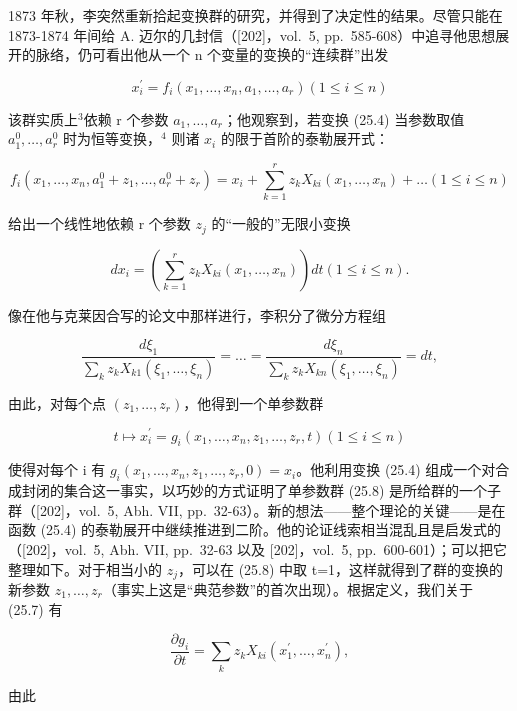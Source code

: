 1873 年秋，李突然重新拾起变换群的研究，并得到了决定性的结果。尽管只能在 1873-1874 年间给 A. 迈尔的几封信（{[}202{]}，vol.~5, pp.~585-608）中追寻他思想展开的脉络，仍可看出他从一个 n 个变量的变换的“连续群”出发

\[
x _ {i} ^ {\prime} = f _ {i} (x _ {1}, \dots , x _ {n}, a _ {1}, \dots , a _ {r}) (1 \leq i \leq n)\tag{25.4}
\]

该群实质上\(^{3}\)依赖 r 个参数 \(a_{1},\ldots,a_{r}\)；他观察到，若变换 (25.4) 当参数取值 \(a_{1}^{0},\ldots,a_{r}^{0}\) 时为恒等变换，\(^{4}\) 则诸 \(x_{i}\) 的限于首阶的泰勒展开式：

\[
f _ {i} \left(x _ {1}, \dots , x _ {n}, a _ {1} ^ {0} + z _ {1}, \dots , a _ {r} ^ {0} + z _ {r}\right) = x _ {i} + \sum_ {k = 1} ^ {r} z _ {k} X _ {k i} \left(x _ {1}, \dots , x _ {n}\right) + \dots (1 \leq i \leq n)\tag{25.5}
\]

给出一个线性地依赖 r 个参数 \(z_{j}\) 的“一般的”无限小变换

\[
d x _ {i} = \left(\sum_ {k = 1} ^ {r} z _ {k} X _ {k i} (x _ {1}, \dots , x _ {n})\right) d t (1 \leq i \leq n).\tag{25.6}
\]

像在他与克莱因合写的论文中那样进行，李积分了微分方程组

\[
\frac {d \xi_ {1}}{\sum_ {k} z _ {k} X _ {k 1} (\xi_ {1} , \dots , \xi_ {n})} = \dots = \frac {d \xi_ {n}}{\sum_ {k} z _ {k} X _ {k n} (\xi_ {1} , \dots , \xi_ {n})} = d t,\tag{25.7}
\]

由此，对每个点 \((z_{1},\ldots,z_{r})\)，他得到一个单参数群

\[
t \mapsto x _ {i} ^ {\prime} = g _ {i} (x _ {1}, \dots , x _ {n}, z _ {1}, \dots , z _ {r}, t) (1 \leq i \leq n)\tag{25.8}
\]

使得对每个 i 有 \(g_{i}(x_{1},\ldots,x_{n},z_{1},\ldots,z_{r},0)=x_{i}\)。他利用变换 (25.4) 组成一个对合成封闭的集合这一事实，以巧妙的方式证明了单参数群 (25.8) 是所给群的一个子群（{[}202{]}，vol.~5, Abh. VII, pp.~32-63）。新的想法——整个理论的关键——是在函数 (25.4) 的泰勒展开中继续推进到二阶。他的论证线索相当混乱且是启发式的（{[}202{]}，vol.~5, Abh. VII, pp.~32-63 以及 {[}202{]}，vol.~5, pp.~600-601）；可以把它整理如下。对于相当小的 \(z_{j}\)，可以在 (25.8) 中取 t=1，这样就得到了群的变换的新参数 \(z_{1},\ldots,z_{r}\)（事实上这是“典范参数”的首次出现）。根据定义，我们关于 (25.7) 有

\[
\frac {\partial g _ {i}}{\partial t} = \sum_ {k} z _ {k} X _ {k i} (x _ {1} ^ {\prime}, \dots , x _ {n} ^ {\prime}),
\]

由此

